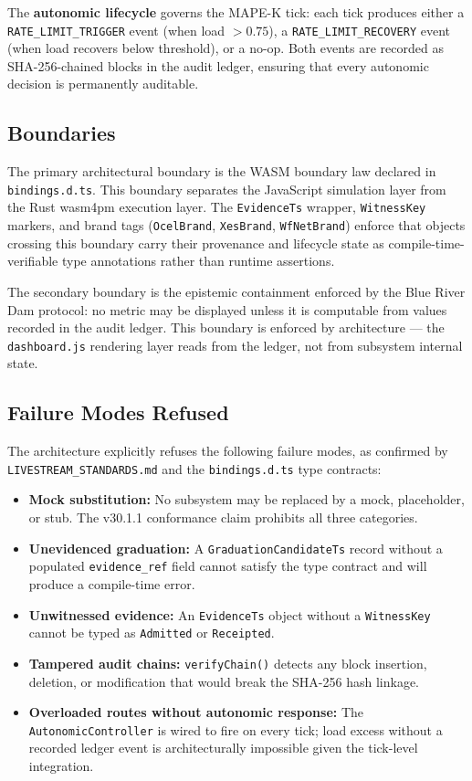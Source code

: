 The \textbf{autonomic lifecycle} governs the MAPE-K tick: each tick produces either a
\texttt{RATE\_LIMIT\_TRIGGER} event (when load $> 0.75$), a \texttt{RATE\_LIMIT\_RECOVERY}
event (when load recovers below threshold), or a no-op. Both events are recorded as
SHA-256-chained blocks in the audit ledger, ensuring that every autonomic decision is
permanently auditable.

\subsection{Boundaries}
\label{sec:experiments-visualizer-arch-boundaries}

The primary architectural boundary is the WASM boundary law declared in \texttt{bindings.d.ts}.
This boundary separates the JavaScript simulation layer from the Rust wasm4pm execution layer.
The \texttt{EvidenceTs} wrapper, \texttt{WitnessKey} markers, and brand tags
(\texttt{OcelBrand}, \texttt{XesBrand}, \texttt{WfNetBrand}) enforce that objects crossing
this boundary carry their provenance and lifecycle state as compile-time-verifiable type
annotations rather than runtime assertions.

The secondary boundary is the epistemic containment enforced by the Blue River Dam protocol:
no metric may be displayed unless it is computable from values recorded in the audit ledger.
This boundary is enforced by architecture — the \texttt{dashboard.js} rendering layer reads
from the ledger, not from subsystem internal state.

\subsection{Failure Modes Refused}
\label{sec:experiments-visualizer-arch-failures}

The architecture explicitly refuses the following failure modes, as confirmed by
\texttt{LIVESTREAM\_STANDARDS.md} and the \texttt{bindings.d.ts} type contracts:

\begin{itemize}
  \item \textbf{Mock substitution:} No subsystem may be replaced by a mock, placeholder, or stub.
        The v30.1.1 conformance claim prohibits all three categories.
  \item \textbf{Unevidenced graduation:} A \texttt{GraduationCandidateTs} record without a
        populated \texttt{evidence\_ref} field cannot satisfy the type contract and will produce
        a compile-time error.
  \item \textbf{Unwitnessed evidence:} An \texttt{EvidenceTs} object without a \texttt{WitnessKey}
        cannot be typed as \texttt{Admitted} or \texttt{Receipted}.
  \item \textbf{Tampered audit chains:} \texttt{verifyChain()} detects any block insertion,
        deletion, or modification that would break the SHA-256 hash linkage.
  \item \textbf{Overloaded routes without autonomic response:} The \texttt{AutonomicController}
        is wired to fire on every tick; load excess without a recorded ledger event is
        architecturally impossible given the tick-level integration.
\end{itemize}
